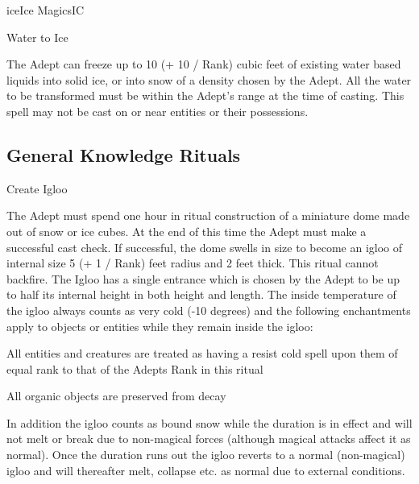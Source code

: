 \begin{college}[1.5]{ice}{Ice Magics}{IC}
\begin{spell}[G-8]{Water to Ice}

\begin{effects}
The Adept can freeze up to 10 (+ 10 / Rank) cubic feet of existing
water based liquids into solid ice, or into snow of a density chosen
by the Adept. All the water to be transformed must be within the
Adept's range at the time of casting. This spell may not be cast on or
near entities or their possessions.
\end{effects}
\end{spell}

\subsection{General Knowledge Rituals}

\begin{ritual}[Q-1]{Create Igloo}

\begin{effects}
The Adept must spend one hour in ritual construction of a miniature
dome made out of snow or ice cubes. At the end of this time the Adept
must make a successful cast check. If successful, the dome swells in
size to become an igloo of internal size 5 (+ 1 / Rank) feet radius
and 2 feet thick.  This ritual cannot backfire.  The Igloo has a
single entrance which is chosen by the Adept to be up to half its
internal height in both height and length. The inside temperature of
the igloo always counts as very cold (-10 degrees) and the following
enchantments apply to objects or entities while they remain inside the
igloo:
\begin{Itemize}
\item All entities and creatures are treated as having a resist cold
spell upon them of equal rank to that of the Adepts Rank in this
ritual
\item All organic objects are preserved from decay
\end{Itemize}
In addition the igloo counts as bound snow while the duration is in
effect and will not melt or break due to non-magical forces (although
magical attacks affect it as normal).  Once the duration runs out the
igloo reverts to a normal (non-magical) igloo and will thereafter
melt, collapse etc. as normal due to external conditions.
\end{effects}
\end{ritual}


\end{college}
